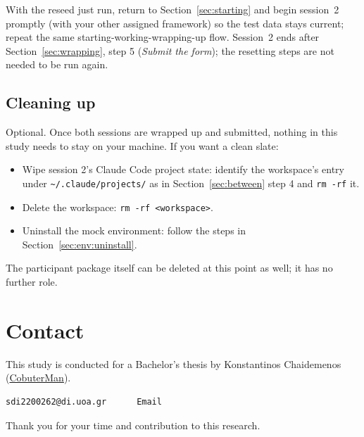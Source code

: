 \documentclass[11pt, a4paper]{article}
\begin{document}
With the reseed just run, return to Section~\ref{sec:starting} and begin session~2 promptly (with your other assigned framework) so the test data stays current; repeat the same starting-working-wrapping-up flow. Session~2 ends after Section~\ref{sec:wrapping}, step 5 (\emph{Submit the form}); the resetting steps are not needed to be run again.

\subsection{Cleaning up}
\label{sec:teardown}

Optional. Once both sessions are wrapped up and submitted, nothing in this study needs to stay on your machine. If you want a clean slate:

\begin{itemize}
    \item Wipe session 2's Claude Code project state: identify the workspace's entry under \texttt{\textasciitilde/.claude/projects/} as in Section~\ref{sec:between} step 4 and \texttt{rm -rf} it.
    \item Delete the workspace: \texttt{rm -rf <workspace>}.
    \item Uninstall the mock environment: follow the steps in Section~\ref{sec:env:uninstall}.
\end{itemize}

The participant package itself can be deleted at this point as well; it has no further role.

\section{Contact}
\label{sec:contact}

This study is conducted for a Bachelor's thesis by Konstantinos Chaidemenos (\href{https://github.com/sdi2200262}{CobuterMan}).

\begin{verbatim}
sdi2200262@di.uoa.gr      Email
\end{verbatim}

Thank you for your time and contribution to this research.
\end{document}
